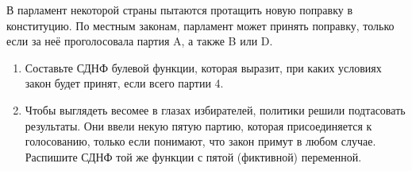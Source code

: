 \question
В парламент некоторой страны пытаются протащить новую поправку в конституцию. По местным законам, парламент может принять поправку, только если за неё проголосовала партия A, а также B или D.

\begin{enumerate}
    \item Составьте СДНФ булевой функции, которая выразит, при каких условиях закон будет принят, если всего партии 4.
    \item Чтобы выглядеть весомее в глазах избирателей, политики решили подтасовать результаты.  Они ввели некую пятую партию, которая присоединяется к голосованию, только если понимают, что закон примут в любом случае. Распишите СДНФ той же функции с пятой (фиктивной) переменной.
\end{enumerate}
